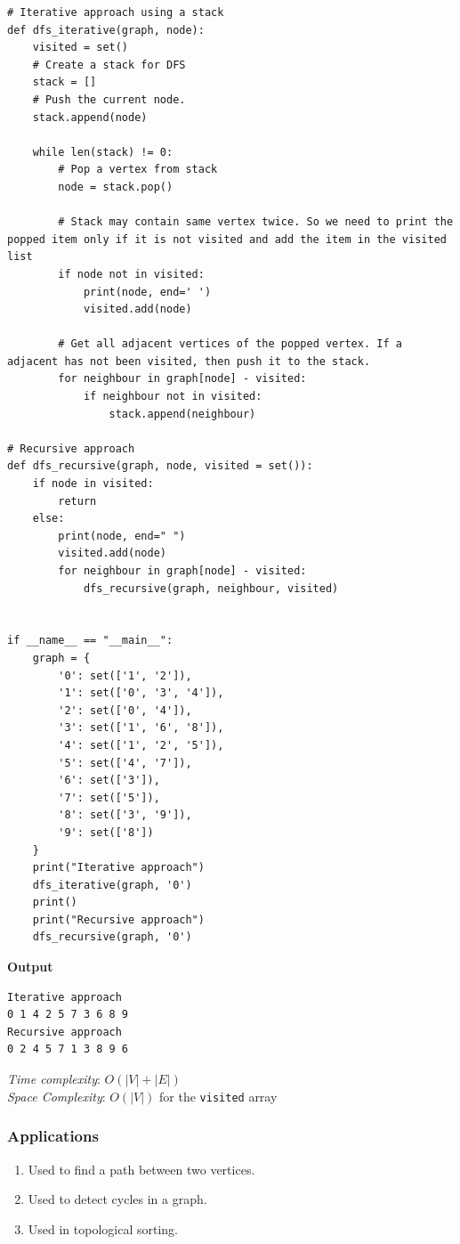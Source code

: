 \documentclass[a4paper,11pt]{book}
\begin{document}
\begin{lstlisting}
# Iterative approach using a stack
def dfs_iterative(graph, node):            
    visited = set()
    # Create a stack for DFS
    stack = []
    # Push the current node.
    stack.append(node)

    while len(stack) != 0:
        # Pop a vertex from stack
        node = stack.pop()

        # Stack may contain same vertex twice. So we need to print the popped item only if it is not visited and add the item in the visited list
        if node not in visited:
            print(node, end=' ')
            visited.add(node)
            
        # Get all adjacent vertices of the popped vertex. If a adjacent has not been visited, then push it to the stack.
        for neighbour in graph[node] - visited:
            if neighbour not in visited:
                stack.append(neighbour)

# Recursive approach
def dfs_recursive(graph, node, visited = set()):
    if node in visited:
        return
    else:
        print(node, end=" ")
        visited.add(node)
        for neighbour in graph[node] - visited:
            dfs_recursive(graph, neighbour, visited)


if __name__ == "__main__":
    graph = {
        '0': set(['1', '2']),
        '1': set(['0', '3', '4']),
        '2': set(['0', '4']),
        '3': set(['1', '6', '8']),
        '4': set(['1', '2', '5']),
        '5': set(['4', '7']),
        '6': set(['3']),
        '7': set(['5']),
        '8': set(['3', '9']),
        '9': set(['8'])
    }
    print("Iterative approach")
    dfs_iterative(graph, '0')
    print()
    print("Recursive approach")
    dfs_recursive(graph, '0')
\end{lstlisting}
\textbf{Output}
\begin{lstlisting}
Iterative approach
0 1 4 2 5 7 3 6 8 9 
Recursive approach
0 2 4 5 7 1 3 8 9 6
\end{lstlisting}

\noindent \textit{Time complexity}: $O(|V| + |E|)$\\
\noindent \textit{Space Complexity}: $O(|V|)$ for the \lstinline{visited} array

\subsubsection{Applications}

\begin{enumerate}
    \item Used to find a path between two vertices.
\item Used to detect cycles in a graph.
\item Used in topological sorting.
\end{enumerate}
\end{document}
